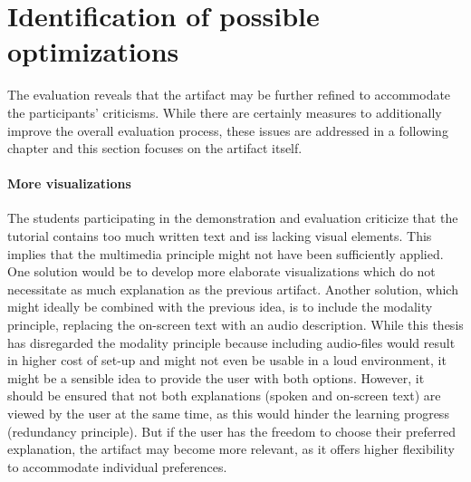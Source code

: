 \section{Identification of possible optimizations} \label{sec:Optimizations}
The evaluation reveals that the artifact may be further refined to accommodate the participants' criticisms. While there are certainly measures to additionally improve the overall evaluation process, these issues are addressed in a following chapter and this section focuses on the artifact itself.

\paragraph{More visualizations} The students participating in the demonstration and evaluation criticize that the tutorial contains too much written text and iss lacking visual elements. This implies that the multimedia principle might not have been sufficiently applied. One solution would be to develop more elaborate visualizations which do not necessitate as much explanation as the previous artifact. Another solution, which might ideally be combined with the previous idea, is to include the modality principle, replacing the on-screen text with an audio description. While this thesis has disregarded the modality principle because including audio-files would result in higher cost of set-up and might not even be usable in a loud environment, it might be a sensible idea to provide the user with both options. However, it should be ensured that not both explanations (spoken and on-screen text) are viewed by the user at the same time, as this would hinder the learning progress (redundancy principle). But if the user has the freedom to choose their preferred explanation, the artifact may become more relevant, as it offers higher flexibility to accommodate individual preferences.

